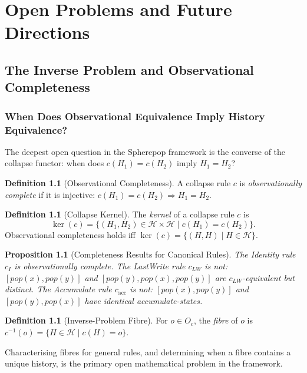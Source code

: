 \documentclass[12pt, a4paper, openany]{book}
\theoremstyle{plain}
\newtheorem{proposition}[theorem]{Proposition}
\theoremstyle{definition}
\newtheorem{definition}[theorem]{Definition}
\theoremstyle{remark}
\newcommand{\calH}{\mathcal{H}}
\begin{document}
\part{Open Problems and Future Directions}

\chapter{The Inverse Problem and Observational Completeness}

\section{When Does Observational Equivalence Imply History Equivalence?}

The deepest open question in the Spherepop framework is the converse of the
collapse functor: when does $c(H_1) = c(H_2)$ imply $H_1 = H_2$?

\begin{definition}[Observational Completeness]
A collapse rule $c$ is \emph{observationally complete} if it is injective:
$c(H_1) = c(H_2) \Rightarrow H_1 = H_2$.
\end{definition}

\begin{definition}[Collapse Kernel]
The \emph{kernel} of a collapse rule $c$ is
\[
\ker(c) = \{(H_1, H_2) \in \calH \times \calH \mid c(H_1) = c(H_2)\}.
\]
Observational completeness holds iff $\ker(c) = \{(H, H) \mid H \in \calH\}$.
\end{definition}

\begin{proposition}[Completeness Results for Canonical Rules]
The Identity rule $c_I$ is observationally complete. The LastWrite rule $c_{LW}$
is not: $[pop(x), pop(y)]$ and $[pop(y), pop(x), pop(y)]$ are
$c_{LW}$-equivalent but distinct. The Accumulate rule $c_{\mathrm{acc}}$ is not:
$[pop(x), pop(y)]$ and $[pop(y), pop(x)]$ have identical accumulate-states.
\end{proposition}

\begin{definition}[Inverse-Problem Fibre]
For $o \in O_c$, the \emph{fibre} of $o$ is
$c^{-1}(o) = \{H \in \calH \mid c(H) = o\}$.
\end{definition}

Characterising fibres for general rules, and determining when a fibre contains a
unique history, is the primary open mathematical problem in the framework.
\end{document}
